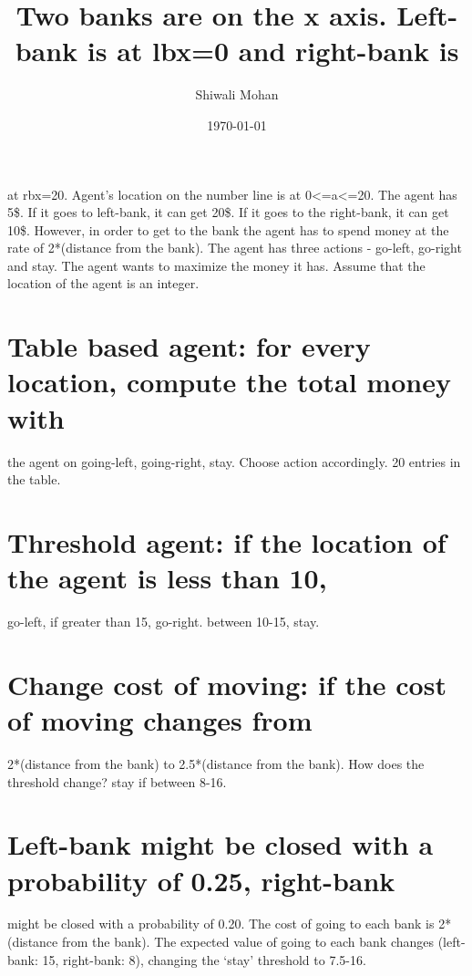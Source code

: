 \documentclass[11pt]{article}
\title{Two banks are on the x axis. Left-bank is at lbx=0 and right-bank is}
\author{Shiwali Mohan}
\date{\today}
\begin{document}
\maketitle

\setcounter{tocdepth}{3}
\tableofcontents
\vspace*{1cm}
at rbx=20. Agent's location on the number line is at 0<=a<=20. The agent
has 5\$. If it goes to left-bank, it can get 20\$. If it goes to the
right-bank, it can get 10\$. However, in order to get to the bank the
agent has to spend money at the rate of 2*(distance from the
bank). The agent has three actions - go-left, go-right and stay. The
agent wants to maximize the money it has. Assume that the location of
the agent is an integer.

\section{Table based agent: for every location, compute the total money with}
\label{sec-1}

 the agent on going-left, going-right, stay. Choose action
 accordingly. 20 entries in the table.
\section{Threshold agent: if the location of the agent is less than 10,}
\label{sec-2}

 go-left, if greater than 15, go-right. between 10-15, stay.
\section{Change cost of moving: if the cost of moving changes from}
\label{sec-3}

 2*(distance from the bank) to 2.5*(distance from the bank). How does
 the threshold change? stay if between 8-16.
\section{Left-bank might be closed with a probability of 0.25, right-bank}
\label{sec-4}

 might be closed with a probability of 0.20. The cost of going to
 each bank is 2*(distance from the bank). The expected value of
 going to each bank changes (left-bank: 15, right-bank: 8), changing
 the `stay' threshold to 7.5-16.
\end{document}
